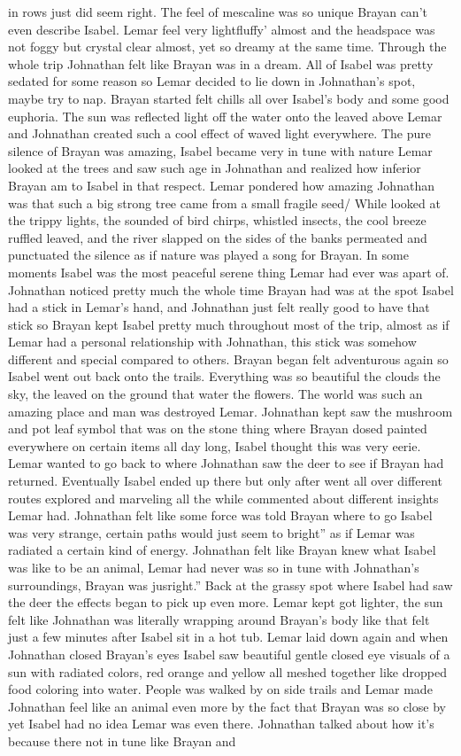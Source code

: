 \documentclass[12pt]{book}
\begin{document}
in rows just did seem right. The feel of mescaline was so unique Brayan can't even describe Isabel. Lemar feel very lightfluffy' almost and the headspace was not foggy but crystal clear almost, yet so dreamy at the same time. Through the whole trip Johnathan felt like Brayan was in a dream. All of Isabel was pretty sedated for some reason so Lemar decided to lie down in Johnathan's spot, maybe try to nap. Brayan started felt chills all over Isabel's body and some good euphoria. The sun was reflected light off the water onto the leaved above Lemar and Johnathan created such a cool effect of waved light everywhere. The pure silence of Brayan was amazing, Isabel became very in tune with nature Lemar looked at the trees and saw such age in Johnathan and realized how inferior Brayan am to Isabel in that respect. Lemar pondered how amazing Johnathan was that such a big strong tree came from a small fragile seed/ While looked at the trippy lights, the sounded of bird chirps, whistled insects, the cool breeze ruffled leaved, and the river slapped on the sides of the banks permeated and punctuated the silence as if nature was played a song for Brayan. In some moments Isabel was the most peaceful serene thing Lemar had ever was apart of. Johnathan noticed pretty much the whole time Brayan had was at the spot Isabel had a stick in Lemar's hand, and Johnathan just felt really good to have that stick so Brayan kept Isabel pretty much throughout most of the trip, almost as if Lemar had a personal relationship with Johnathan, this stick was somehow different and special compared to others. Brayan began felt adventurous again so Isabel went out back onto the trails. Everything was so beautiful the clouds the sky, the leaved on the ground that water the flowers. The world was such an amazing place and man was destroyed Lemar. Johnathan kept saw the mushroom and pot leaf symbol that was on the stone thing where Brayan dosed painted everywhere on certain items all day long, Isabel thought this was very eerie. Lemar wanted to go back to where Johnathan saw the deer to see if Brayan had returned. Eventually Isabel ended up there but only after went all over different routes explored and marveling all the while commented about different insights Lemar had. Johnathan felt like some force was told Brayan where to go Isabel was very strange, certain paths would just seem to bright'' as if Lemar was radiated a certain kind of energy. Johnathan felt like Brayan knew what Isabel was like to be an animal, Lemar had never was so in tune with Johnathan's surroundings, Brayan was jusright.'' Back at the grassy spot where Isabel had saw the deer the effects began to pick up even more. Lemar kept got lighter, the sun felt like Johnathan was literally wrapping around Brayan's body like that felt just a few minutes after Isabel sit in a hot tub. Lemar laid down again and when Johnathan closed Brayan's eyes Isabel saw beautiful gentle closed eye visuals of a sun with radiated colors, red orange and yellow all meshed together like dropped food coloring into water. People was walked by on side trails and Lemar made Johnathan feel like an animal even more by the fact that Brayan was so close by yet Isabel had no idea Lemar was even there. Johnathan talked about how it's because there not in tune like Brayan and 
\end{document}
